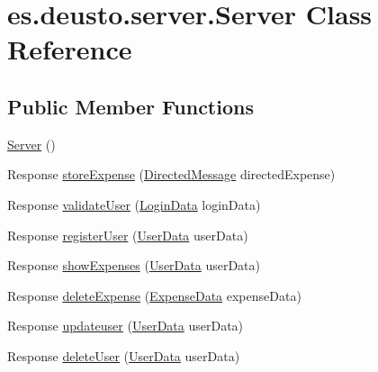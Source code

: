\hypertarget{classes_1_1deusto_1_1server_1_1_server}{}\section{es.\+deusto.\+server.\+Server Class Reference}
\label{classes_1_1deusto_1_1server_1_1_server}
\subsection*{Public Member Functions}
\begin{DoxyCompactItemize}
\item 
\hyperlink{classes_1_1deusto_1_1server_1_1_server_a84f78162a65dd737f224eb2f94c43023}{Server} ()
\item 
Response \hyperlink{classes_1_1deusto_1_1server_1_1_server_a1a91c5bde8d3b39fc4292dc09d62b61b}{store\+Expense} (\hyperlink{classes_1_1deusto_1_1serialization_1_1_directed_message}{Directed\+Message} directed\+Expense)
\item 
Response \hyperlink{classes_1_1deusto_1_1server_1_1_server_a6e5f5013058ddaf970b0b21da2e32f66}{validate\+User} (\hyperlink{classes_1_1deusto_1_1serialization_1_1_login_data}{Login\+Data} login\+Data)
\item 
Response \hyperlink{classes_1_1deusto_1_1server_1_1_server_a12f56d7a970c3c41fefe8ed2db835c0a}{register\+User} (\hyperlink{classes_1_1deusto_1_1serialization_1_1_user_data}{User\+Data} user\+Data)
\item 
Response \hyperlink{classes_1_1deusto_1_1server_1_1_server_aa28b04cc2643cf60072fc2a680288cde}{show\+Expenses} (\hyperlink{classes_1_1deusto_1_1serialization_1_1_user_data}{User\+Data} user\+Data)
\item 
Response \hyperlink{classes_1_1deusto_1_1server_1_1_server_aa9fc28b2ce1a31d8176a23768e48f173}{delete\+Expense} (\hyperlink{classes_1_1deusto_1_1serialization_1_1_expense_data}{Expense\+Data} expense\+Data)
\item 
Response \hyperlink{classes_1_1deusto_1_1server_1_1_server_aae24e983f2b93173ee25d366a522a936}{updateuser} (\hyperlink{classes_1_1deusto_1_1serialization_1_1_user_data}{User\+Data} user\+Data)
\item 
Response \hyperlink{classes_1_1deusto_1_1server_1_1_server_a97535594f4d5406d52e93e093cf6c5bd}{delete\+User} (\hyperlink{classes_1_1deusto_1_1serialization_1_1_user_data}{User\+Data} user\+Data)
\end{DoxyCompactItemize}


